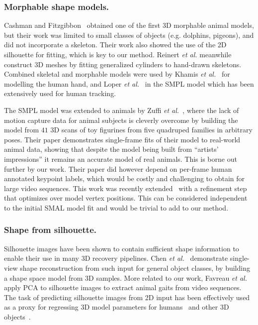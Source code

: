 \subsubsection*{Morphable shape models.}
Cashman and Fitzgibbon~\cite{cashman2013shape} obtained one of the first 3D morphable animal models, but their work was limited to small classes of objects (e.g. dolphins, pigeons), and did not incorporate a skeleton.  Their work also showed the use of the 2D silhouette for fitting, which is key to our method. 
Reinert {\em et al.} \cite{reinert2016animated} meanwhile construct 3D meshes by fitting generalized cylinders to hand-drawn skeletons.
Combined skeletal and morphable models were used by Khamis {\em et al.}~\cite{hand-shape} for modelling the human hand, and Loper {\em et al.}~\cite{loper2015smpl} in the SMPL model which has been extensively used for human tracking. 

The SMPL model was extended to animals by Zuffi {\em et al.}~\cite{zuffi2017menagerie}, where the lack of motion capture data for animal subjects is cleverly overcome by building the model from $41$ 3D scans of toy figurines from five quadruped families in arbitrary poses. Their paper demonstrates single-frame fits of their model to real-world animal data, showing that despite the model being built from ``artists' impressions'' it remains an accurate model of real animals. This is borne out further by our work.  Their paper did however depend on per-frame human annotated keypoint labels, which would be costly and challenging to obtain for large video sequences. This work was recently extended~\cite{zuffi_lions} with a refinement step that optimizes over model vertex positions. This can be considered independent to the initial SMAL model fit and would be trivial to add to our method.

\subsubsection*{Shape from silhouette.} Silhouette images have been shown to contain sufficient shape information to enable their use in many 3D recovery pipelines. Chen {\em et al.}~\cite{chen2010inferring} demonstrate single-view shape reconstruction from such input for general object classes, by building a shape space model from 3D samples. More related to our work, Favreau {\em et al.}~\cite{favreau2004animal} apply PCA to silhouette images to extract animal gaits from video sequences. The task of predicting silhouette images from 2D input has been effectively used as a proxy for regressing 3D model parameters for humans~\cite{indirect2017,hmrKanazawa17} and other 3D objects~\cite{wiles2017silnet}.

